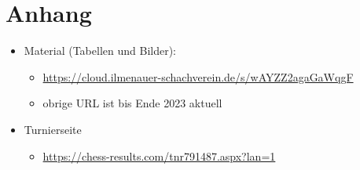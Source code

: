 \documentclass[a4paper,ngerman]{tui-algo-seminar}
\begin{document}
\section{Anhang}

\begin{itemize}
    \item Material (Tabellen und Bilder): 
    \begin{itemize}
        \item \url{https://cloud.ilmenauer-schachverein.de/s/wAYZZ2agaGaWqgF}
        \item obrige URL ist bis Ende 2023 aktuell 
    \end{itemize}
        \item Turnierseite
        \begin{itemize}
            \item \url{https://chess-results.com/tnr791487.aspx?lan=1}
        \end{itemize}
    \end{itemize}
\end{document}
